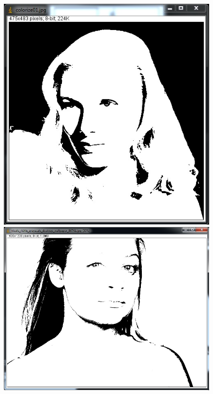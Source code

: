 \begin{figure}[htbp] \centering
\begin{minipage}[b]{0.45\textwidth} \centering
\includegraphics[width=1.00\textwidth]{Pictures/Theory/SimpleThresholdAfter} %
\end{minipage} \hfill
\begin{minipage}[b]{0.45\textwidth} \centering
\includegraphics[width=1.00\textwidth]{Pictures/Theory/ComplicatedThresholdAfter} %

\end{minipage}
\end{figure}
